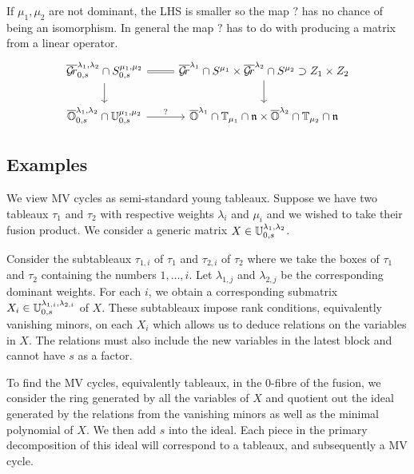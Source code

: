 \documentclass[draft]{article}
\begin{document}
\begin{question}
    If $\mu_1,\mu_2$ are not dominant, the LHS is smaller so the map $?$ has no chance of being an isomorphism. In general the map $?$ has to do with producing a matrix from a linear operator. 
    \[
    \begin{tikzcd}
        \overline\Gr^{\lambda_1,\lambda_2}_{0,s}\cap S^{\mu_1,\mu_2}_{0,s} \ar[r,equals]\ar[d] & \overline\Gr^{\lambda_1} \cap S^{\mu_1} \times \overline\Gr^{\lambda_2} \cap S^{\mu_2} \supset Z_1 \times Z_2 \ar[d]\\
        \overline\OO^{\lambda_1,\lambda_2}_{0,s} \cap \UU^{\mu_1,\mu_2}_{0,s} \ar[r,"?"] & \overline\OO^{\lambda_1}\cap \TT_{\mu_1}\cap \n \times \overline\OO^{\lambda_2}\cap \TT_{\mu_2}\cap \n
    \end{tikzcd}    
    \]
\end{question}

\subsection{Examples}


We view MV cycles as semi-standard young tableaux. Suppose we have two tableaux $\tau_1$ and $\tau_2$ with respective weights $\lambda_i$ and $\mu_i$ and we wished to take their fusion product. We consider a generic matrix $X \in \mathbb U^{\lambda_1,\lambda_2}_{0,s}$. 

Consider the subtableaux $\tau_{1,i}$ of $\tau_1$ and $\tau_{2,i}$ of $\tau_2$ where we take the boxes of $\tau_1$ and $\tau_2$ containing the numbers $1,\dots,i$. Let $\lambda_{1,j}$ and $\lambda_{2,j}$ be the corresponding dominant weights. For each $i$, we obtain a corresponding submatrix $X_i \in \mathbb U^{\lambda_{1,i}, \lambda_{2,i}}_{0,s}$ of $X$. These subtableaux impose rank conditions, equivalently vanishing minors, on each $X_i$ which allows us to deduce relations on the variables in $X$. The relations must also include the new variables in the latest block and cannot have $s$ as a factor.

To find the MV cycles, equivalently tableaux, in the $0$-fibre of the fusion, we consider the ring generated by all the variables of $X$ and quotient out the ideal generated by the relations from the vanishing minors as well as the minimal polynomial of $X$. We then add $s$ into the ideal. Each piece in the primary decomposition of this ideal will correspond to a tableaux, and subsequently a MV cycle.
\end{document}
